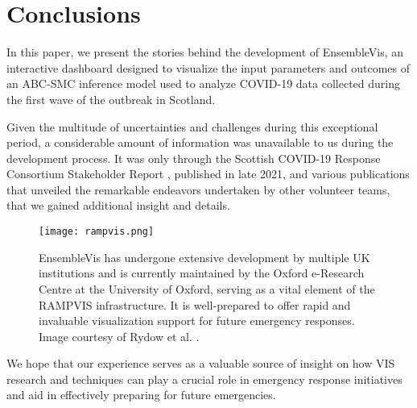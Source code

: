 \section{Conclusions}

In this paper, we present the stories behind the development of EnsembleVis, an interactive dashboard designed to visualize the input parameters and outcomes of an \ac{ABC-SMC} inference model used to analyze COVID-19 data collected during the first wave of the outbreak in Scotland.

Given the multitude of uncertainties and challenges during this exceptional period, a considerable amount of information was unavailable to us during the development process. It was only through the Scottish COVID-19 Response Consortium Stakeholder Report \cite{abdalla2021Scottish}, published in late 2021, and various publications \cite{chen2022RAMPVIS,dykes2022Visualizationb,khan2022Propagating,khan2022Rapid,rydow2023RAMPVIS} that unveiled the remarkable endeavors undertaken by other volunteer teams, that we gained additional insight and details.

\begin{figure}[tb!]
    \centering
    \texttt{[image: rampvis.png]}
    \caption{EnsembleVis has undergone extensive development by multiple UK institutions and is currently maintained by the Oxford e-Research Centre at the University of Oxford, serving as a vital element of the RAMPVIS infrastructure. It is well-prepared to offer rapid and invaluable visualization support for future emergency responses. Image courtesy of Rydow et al. \cite{rydow2023RAMPVIS}.
    }
    \label{fig:rampvis}

\end{figure}

We hope that our experience serves as a valuable source of insight on how VIS research and techniques can play a crucial role in emergency response initiatives and aid in effectively preparing for future emergencies.